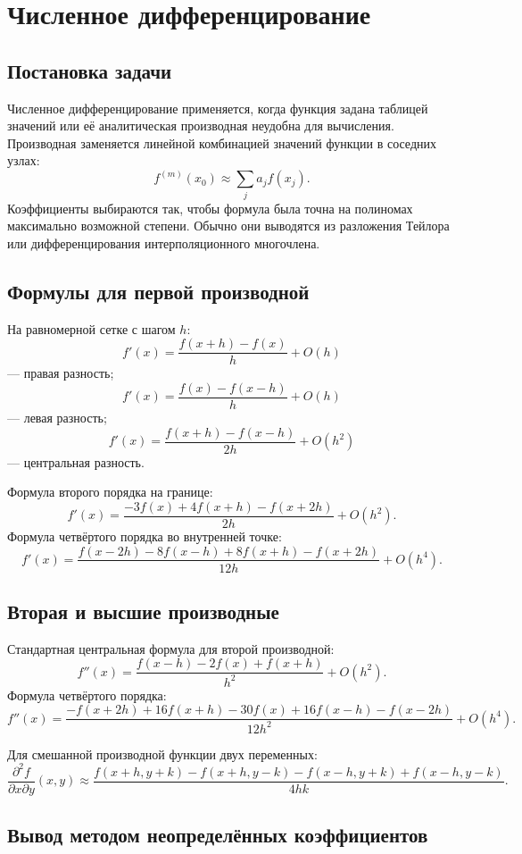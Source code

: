 \section{Численное дифференцирование}
\label{sec:numerical-differentiation}

\subsection{Постановка задачи}

Численное дифференцирование применяется, когда функция задана таблицей значений
или её аналитическая производная неудобна для вычисления. Производная заменяется
линейной комбинацией значений функции в соседних узлах:
\[
    f^{(m)}(x_0)\approx\sum_{j}a_jf(x_j).
\]
Коэффициенты выбираются так, чтобы формула была точна на полиномах максимально
возможной степени. Обычно они выводятся из разложения Тейлора или
дифференцирования интерполяционного многочлена.

\subsection{Формулы для первой производной}

На равномерной сетке с шагом $h$:
\[
    f'(x)=\frac{f(x+h)-f(x)}{h}+O(h)
\]
--- правая разность;
\[
    f'(x)=\frac{f(x)-f(x-h)}{h}+O(h)
\]
--- левая разность;
\[
    f'(x)=\frac{f(x+h)-f(x-h)}{2h}+O(h^2)
\]
--- центральная разность.

Формула второго порядка на границе:
\[
    f'(x)=\frac{-3f(x)+4f(x+h)-f(x+2h)}{2h}+O(h^2).
\]
Формула четвёртого порядка во внутренней точке:
\[
    f'(x)=\frac{f(x-2h)-8f(x-h)+8f(x+h)-f(x+2h)}{12h}
    +O(h^4).
\]

\subsection{Вторая и высшие производные}

Стандартная центральная формула для второй производной:
\[
    f''(x)=\frac{f(x-h)-2f(x)+f(x+h)}{h^2}+O(h^2).
\]
Формула четвёртого порядка:
\[
    f''(x)=\frac{-f(x+2h)+16f(x+h)-30f(x)+16f(x-h)-f(x-2h)}{12h^2}
    +O(h^4).
\]

Для смешанной производной функции двух переменных:
\[
\frac{\partial^2 f}{\partial x\partial y}(x,y)
\approx
\frac{f(x+h,y+k)-f(x+h,y-k)-f(x-h,y+k)+f(x-h,y-k)}{4hk}.
\]

\subsection{Вывод методом неопределённых коэффициентов}

